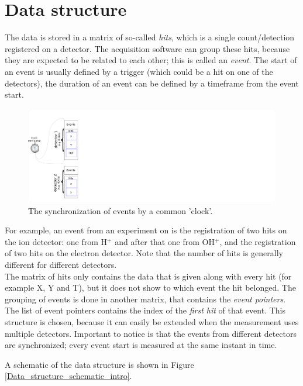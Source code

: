 \section{Data structure}
The data is stored in a matrix of so-called \emph{hits}, which is a single count/detection registered on a detector. The acquisition software can group these hits, because they are expected to be related to each other; this is called an \emph{event}. The start of an event is usually defined by a trigger (which could be a hit on one of the detectors), the duration of an event can be defined by a timeframe from the event start.

\begin{figure}[h]
   \centering
    \centerline{\includegraphics[width=1\textwidth]{Graphics/synchronization.pdf}}
\caption{The synchronization of events by a common 'clock'.}
\label{event_synchronization}
\end{figure}

For example, an event from an experiment on  is the registration of two hits on the ion detector: one from H$^+$ and after that one from OH$^+$, and the registration of two hits on the electron detector. Note that the number of hits is generally different for different detectors.
\\
The matrix of hits only contains the data that is given along with every hit (for example X, Y and T), but it does not show to which event the hit belonged. The grouping of events is done in another matrix, that contains the \emph{event pointers}. The list of event pointers contains the index of the \emph{first hit} of that event. 
This structure is chosen, because it can easily be extended when the measurement uses multiple detectors.
Important to notice is that the events from different detectors are synchronized; every event start is measured at the same instant in time. 

A schematic of the data structure is shown in Figure \ref{Data_structure_schematic_intro}.

